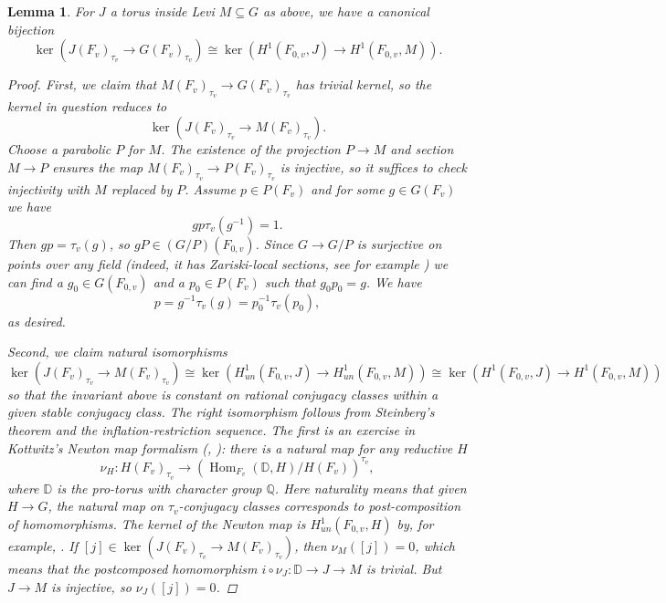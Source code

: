 \documentclass[openany]{amsbook}
\newtheorem{lemma}[theorem]{Lemma}
\theoremstyle{definition}
\theoremstyle{remark}
\numberwithin{equation}{section}
\newcommand{\Q}{\mathbb{Q}}
\newcommand{\D}{\mathbb{D}}
\renewcommand{\-}{\operatorname{-}}
\newcommand{\Hom}{\operatorname{Hom}}
\begin{document}
\begin{lemma}\label{lem.inv.red.stable.conj}
    For $J$ a torus inside Levi $M \subseteq G$ as above, we have a canonical bijection
    $$
        \ker(J(F_v)_{\tau_v} \to G(F_v)_{\tau_v}) \cong \ker(H^1(F_{0,v}, J) \to H^1(F_{0,v}, M)).
    $$
    \begin{proof}
        First, we claim that $M(F_v)_{\tau_v} \to G(F_v)_{\tau_v}$ has trivial kernel, so the kernel in question reduces to
        $$\ker(J(F_v)_{\tau_v} \to M(F_v)_{\tau_v}).$$ Choose a parabolic $P$ for $M$. The existence of the projection $P \to M$ and section $M \to P$ ensures the map $M(F_v)_{\tau_v} \to P(F_v)_{\tau_v}$ is injective, so it suffices to check injectivity with $M$ replaced by $P$. Assume $p \in P(F_v)$ and for some $g \in G(F_v)$ we have
        \[
            g p {\tau_v}(g^{-1}) = 1. 
        \]
        Then $gp = {\tau_v}(g)$, so $gP \in (G/P)(F_{0,v})$. Since $G \to G/P$ is surjective on points over any field (indeed, it has Zariski-local sections, see for example \cite[Prop. 7.2.1]{conrad2}) we can find a $g_0 \in G(F_{0,v})$ and a $p_0 \in P(F_v)$ such that $g_0 p_0 = g$. We have 
        \[
            p = g^{-1} {\tau_v}(g) = p_0^{-1} {\tau_v}(p_0),
        \]
        as desired. 

        Second, we claim natural isomorphisms
        $$
            \ker(J(F_v)_{\tau_v} \to M(F_v)_{\tau_v}) \cong \ker(H^1_{un}(F_{0,v}, J) \to H^1_{un}(F_{0,v}, M)) \cong \ker(H^1(F_{0,v}, J) \to H^1(F_{0,v}, M))
        $$
        so that the invariant above is constant on rational conjugacy classes within a given stable conjugacy class. The right isomorphism follows from Steinberg's theorem and the inflation-restriction sequence. The first is an exercise in Kottwitz's Newton map formalism (\cite{kottwitzisocrystals}, \cite{kottwitzisocrystalsii}): there is a natural map for any reductive $H$
        $$
            \nu_H : H(F_v)_{\tau_v} \to (\Hom_{F_v}(\D, H)/H(F_v))^{{\tau_v}},
        $$
        where $\D$ is the pro-torus with character group $\Q$. Here naturality means that given $H \to G$, the natural map on ${\tau_v}$-conjugacy classes corresponds to post-composition of homomorphisms. The kernel of the Newton map is $H^1_{un}(F_{0,v}, H)$ by, for example, \cite[Lemma 4.7]{GisoshtukasHK}. If $[j] \in \ker(J(F_v)_{\tau_v} \to M(F_v)_{\tau_v})$, then $\nu_M([j]) = 0$, which means that the postcomposed homomorphism $ i\circ\nu_{J} : \D \to J \to M$ is trivial. But $J \to M$ is injective, so $\nu_{J}([j]) = 0$. 
    \end{proof}
\end{lemma}
\end{document}
